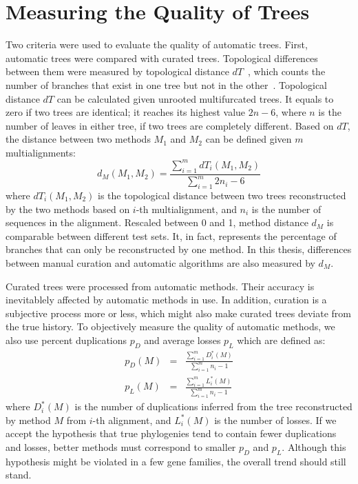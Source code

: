 \section{Measuring the Quality of Trees}

Two criteria were used to evaluate the quality of automatic trees. First, automatic trees were
compared with curated trees. Topological differences between them were measured by topological distance $dT$~\cite{robinson81},
which counts the number of branches that exist in one tree but not in the other~\cite{kuhner94}.
Topological distance $dT$ can be calculated given unrooted multifurcated trees. It equals to zero
if two trees are identical; it reaches its highest value $2n-6$, where $n$ is the number of
leaves in either tree, if two trees are completely different. Based on $dT$, the
distance between two methods $M_1$ and $M_2$ can be defined given $m$ multialignments:
\begin{equation}
d_M(M_1,M_2)=\frac{\sum_{i=1}^m{dT_i(M_1,M_2)}}{\sum_{i=1}^m{2n_i-6}}
\end{equation}
where $dT_i(M_1,M_2)$ is the topological distance between two trees reconstructed by the two methods based on
$i$-th multialignment, and $n_i$ is the number of sequences in the alignment.
Rescaled between 0 and 1, method distance $d_M$ is comparable between different test sets.
It, in fact, represents the percentage of branches that can only be
reconstructed by one method. In this thesis, differences between manual curation and automatic algorithms
are also measured by $d_M$.

Curated trees were processed from automatic methods. Their accuracy is inevitablely affected by
automatic methods in use. In addition, curation is a subjective process more or less, which might also make curated
trees deviate from the true history. To objectively measure the quality of automatic methods,
we also use percent duplications $p_D$ and average losses $p_L$ which are defined as:
\begin{eqnarray}
p_D(M) &=& \frac{\sum_{i=1}^m{D^*_i(M)}}{\sum_{i=1}^m{n_i-1}} \\
p_L(M) &=& \frac{\sum_{i=1}^m{L^*_i(M)}}{\sum_{i=1}^m{n_i-1}} 
\end{eqnarray}
where $D^*_i(M)$ is the number of duplications inferred from the tree reconstructed
by method $M$ from $i$-th alignment, and $L^*_i(M)$ is the number of losses. If we
accept the hypothesis that true phylogenies tend to contain fewer duplications and
losses, better methods must correspond to smaller $p_D$ and $p_L$. Although this
hypothesis might be violated in a few gene families, the overall trend should still
stand.

